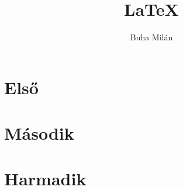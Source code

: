 \documentclass{book}
\title{\huge{\LaTeX}}
\author{Buha Milán}
\begin{document}
	\frontmatter
	\maketitle
	\tableofcontents
	\mainmatter
	\chapter{Első}
	\hulipsum[3]
	\cite{abrharber03}
	\cite{bujfaz}
	\hulipsum[1]
	\cite{g4gbin}
	\chapter{Második}
	\hulipsum
	\chapter{Harmadik}
	\hulipsum[2]
	\cite{knuth84}
	\cite{lamport94}
	\cite{tomacs21}
	\backmatter
	
	
\end{document}

